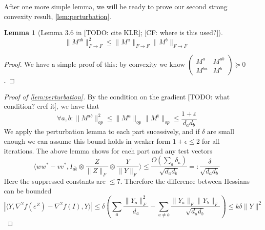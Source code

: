 \documentclass{article}
\newtheorem{lemma}[theorem]{Lemma}
\newcommand\eps{\varepsilon}
\newcommand{\CF}[1]{{\color{purple}[CF: #1]}}
\newcommand{\TODO}[1]{{\color{blue}[TODO: #1]}}
\begin{document}
After one more simple lemma, we will be ready to prove our second strong convexity result, \cref{lem:perturbation}.
\begin{lemma} [Lemma 3.6 in \TODO{cite KLR}; \CF{where is this used?}]
\[ \|M^{ab}\|_{F \to F}^{2} \leq \|M^{a}\|_{F \to F} \|M^{b}\|_{F \to F}   \]
\end{lemma}
\begin{proof}
We have a simple proof of this: by convexity we know $\begin{pmatrix} M^{a} & M^{ab} \\ M^{ba} & M^{b}  \end{pmatrix} \succeq 0$.
\end{proof}

\begin{proof}[Proof of \cref{lem:perturbation}]
By the condition on the gradient \TODO{what condition? cref it}, we have that
\[ \forall a,b: \|M^{ab}\|_{op}^{2} \leq \|M^{a}\|_{op} \|M^{b}\|_{op} \leq \frac{1+\eps}{d_{a} d_{b}}   \]
We apply the perturbation lemma to each part sucessively, and if $\delta$ are small enough we can assume this bound holds in weaker form $1+\epsilon \leq 2$ for all iterations. The above lemma shows for each part and any test vectors
\[ \langle w w^{*} - v v^{*}, I_{\overline{ab}} \otimes \frac{Z}{\|Z\|_{F}} \otimes \frac{Y}{\|Y\|_{F}} \rangle \leq \frac{O( \sum_{a} \delta_{a} )}{\sqrt{d_{a} d_{b}}} =: \frac{\delta}{\sqrt{d_{a} d_{b}}}   \]
Here the suppressed constants are $\leq 7$. Therefore the difference between Hessians can be bounded
\[ |\langle Y, \nabla^{2} f(e^{Z}) - \nabla^{2} f(I), Y \rangle|  \leq \delta \left( \sum_{a} \frac{\|Y_{a}\|_{F}^{2}}{d_{a}} + \sum_{a \neq b} \frac{\|Y_{a}\|_{F} \|Y_{b}\|_{F}}{\sqrt{d_{a} d_{b}}} \right) \leq k \delta \|Y\|^{2}   \]
\end{proof}
\end{document}
